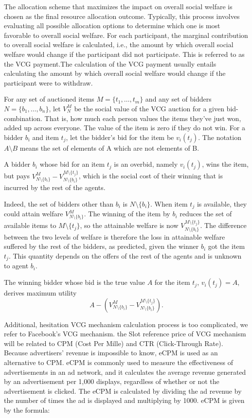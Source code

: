The allocation scheme that maximizes the impact on overall social welfare is chosen as the final resource allocation outcome. Typically, this process involves evaluating all possible allocation options to determine which one is most favorable to overall social welfare. For each participant, the marginal contribution to overall social welfare is calculated, i.e., the amount by which overall social welfare would change if the participant did not participate. This is referred to as the VCG payment.The calculation of the VCG payment usually entails calculating the amount by which overall social welfare would change if the participant were to withdraw.

For any set of auctioned items \( M = \{t_1,\ldots,t_m\} \) and any set of bidders \( N = \{b_1,\ldots,b_n\} \), let \( V^M_N \) be the social value of the VCG auction for a given bid-combination. That is, how much each person values the items they've just won, added up across everyone. The value of the item is zero if they do not win. For a bidder \( b_i \) and item \( t_j \), let the bidder's bid for the item be \( v_{i}(t_{j}) \). The notation \( A \setminus B \) means the set of elements of A which are not elements of B.

A bidder \( b_i \) whose bid for an item \( t_j \) is an overbid, namely \( v_{i}(t_{j}) \), wins the item, but pays \( V^{M}_{N \setminus \{b_i\}}-V^{M \setminus \{t_j\}}_{N \setminus \{b_i\}} \), which is the social cost of their winning that is incurred by the rest of the agents.

Indeed, the set of bidders other than \( b_i \) is \( N \setminus \{b_i\} \). When item \( t_j \) is available, they could attain welfare \( V^{M}_{N \setminus \{b_i\}} \). The winning of the item by \( b_i \) reduces the set of available items to \( M \setminus \{t_j\} \), so the attainable welfare is now \( V^{M \setminus \{t_j\}}_{N \setminus \{b_i\}} \). The difference between the two levels of welfare is therefore the loss in attainable welfare suffered by the rest of the bidders, as predicted, given the winner \( b_i \) got the item \( t_j \). This quantity depends on the offers of the rest of the agents and is unknown to agent \( b_i \).

The winning bidder whose bid is the true value \( A \) for the item \( t_j \), \( v_{i}(t_{j})=A \), derives maximum utility \[ A - \left(V^{M}_{N \setminus \{b_i\}}-V^{M \setminus \{t_j\}}_{N \setminus \{b_i\}}\right) .\]

Additional, hesitation VCG mechanism calculation process is too complicated, we refer to Facebook's VCG mechanism. the Slot reference price of VCG mechanism will be related to CPM (Cost Per Mille) and CTR (Click-Through Rate). Because advertisers' revenue is impossible to know, eCPM is used as an alternative to CPM. eCPM is commonly used to measure the effectiveness of advertisements in an ad network, and it calculates the average revenue generated by an advertisement per 1,000 displays, regardless of whether or not the advertisement is clicked. The eCPM is calculated by dividing the ad revenue by the number of times the ad is displayed and multiplying by 1000. eCPM is given by the formula:

